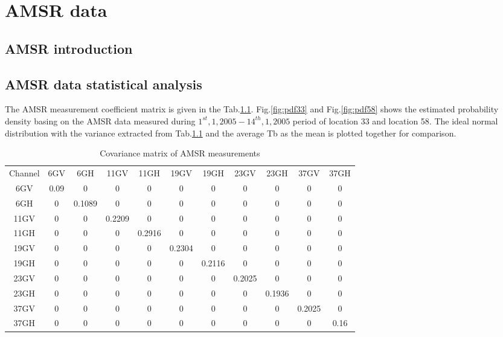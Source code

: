 \chapter{AMSR data}
\label{chap:amsr}

\section{AMSR introduction}
\label{sec:amsr_intro}

\section{AMSR data statistical analysis}
\label{sec:amsr_statstical}
The AMSR measurement coefficient matrix is given in the Tab.\ref{tab:covariance_AMSR}. Fig.\ref{fig:pdf33} and Fig.\ref{fig:pdf58} shows the estimated probability density basing on the AMSR data measured during $1^{st},1,2005-14^{th},1,2005$ period of location 33 and location 58. The ideal normal distribution with the variance extracted from Tab.\ref{tab:covariance_AMSR} and the average Tb as the mean is plotted together for comparison.   
\begin{table}[h]
\centering
   \begin{tabular}{ccccccccccc}

Channel & 6GV&6GH&11GV&11GH&19GV&19GH&23GV&23GH&37GV&37GH\\
6GV& 0.09&      0&      0&      0&      0&       0&      0&      0&      0&      0\\  
6GH&    0&0.1089&      0&      0&      0&       0&      0&      0&      0&      0\\  
11GV&    0&     0& 0.2209&      0&      0&       0&      0&      0&      0&      0\\
11GH&    0&     0&      0& 0.2916&      0&       0&      0&      0&      0&      0\\
19GV&    0&     0&      0&      0& 0.2304&       0&      0&      0&      0&      0\\
19GH&    0&     0&      0&      0&      0& 0.2116&      0&      0&      0&      0\\
23GV&    0&     0&      0&      0&      0&      0& 0.2025&      0&      0&      0\\
23GH&    0&     0&      0&      0&      0&      0&      0& 0.1936&      0&      0\\
37GV&    0&     0&      0&      0&      0&      0&      0&      0& 0.2025&      0\\ 
37GH&    0&     0&      0&      0&      0&      0&      0&      0&       0&     0.16

  \end{tabular}
 \caption{Covariance matrix of AMSR measurements}
 \label{tab:covariance_AMSR}
\end{table}


